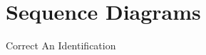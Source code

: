 \documentclass[]{article}
\begin{document}
\section{Sequence Diagrams}
\label{sec:sequence_diagrams}
\begin{center}
	Correct An Identification

\end{center}
\end{document}
